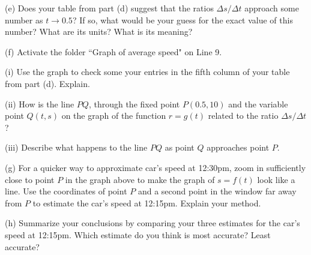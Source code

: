\documentclass{ximera}
\begin{document}
\begin{example}
(e) Does  your table from part (d) suggest that the ratios $\Delta s/ \Delta t$ approach some number as $t\to 0.5$? If so, what would be your guess for the exact value of this number? What are its units? What is its meaning?

(f) Activate the folder ``Graph of average speed" on Line 9. 

(i) Use the graph to check some your entries in the fifth column of your table from part (d). Explain.

(ii) How is the line $PQ$, through the fixed point $P(0.5,10)$ and the variable point $Q(t,s)$ on the graph of the function $r=g(t)$ related to the ratio $\Delta s / \Delta t$?

(iii) Describe what happens to the line $PQ$ as point $Q$ approaches point $P$.

(g) For a quicker way to approximate car's speed at 12:30pm, zoom in sufficiently close to point $P$ in the graph above to make the graph of $s=f(t)$ look like a line. Use the coordinates of point $P$ and a second point in the window far away from $P$ to estimate the car's speed at 12:15pm. Explain your method.

(h) Summarize your conclusions by comparing your three estimates for the car's speed at 12:15pm. Which estimate do you think is most accurate? Least accurate?

\end{example}
\end{document}
